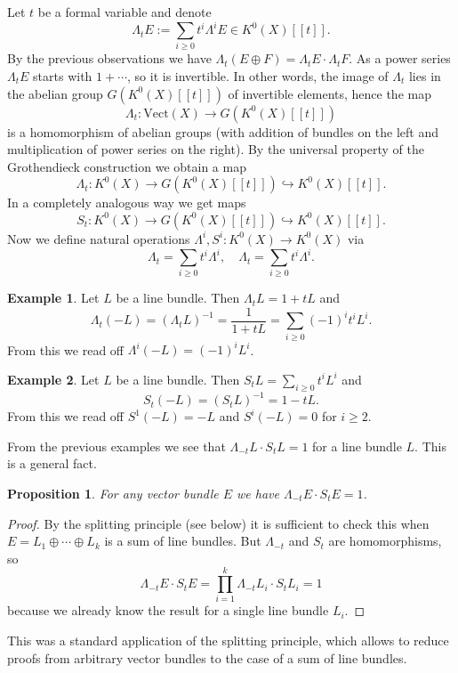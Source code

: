 \documentclass[a4paper,10pt]{article}
\theoremstyle{plain}%
\newtheorem{prop}[thm]{Proposition}
\theoremstyle{definition}
\newtheorem{exmp}{Example}
\theoremstyle{remark}
\newcommand{\Vect}{\mathrm{Vect}}  %
\begin{document}
Let $t$ be a formal variable and denote
$$\Lambda_t E:=\sum_{i\geq 0} t^i\Lambda^i E\in K^0(X)[[t]].$$
By the previous observations we have $\Lambda_t(E\oplus F)=\Lambda_tE\cdot\Lambda_tF$. As a power series $\Lambda_tE$ starts with $1+\cdots$, so it is invertible. In other words, the image of $\Lambda_t$ lies in the abelian group $G(K^0(X)[[t]])$ of invertible elements, hence the map
$$\Lambda_t:\Vect(X)\to G(K^0(X)[[t]])$$
is a homomorphism of abelian groups (with addition of bundles on the left and multiplication of power series on the right). By the universal property of the Grothendieck construction we obtain a map
$$\Lambda_t:K^0(X)\to G(K^0(X)[[t]])\hookrightarrow K^0(X)[[t]].$$
In a completely analogous way we get maps
$$S_t:K^0(X)\to G(K^0(X)[[t]])\hookrightarrow K^0(X)[[t]].$$
Now we define natural operations $\Lambda^i,S^i:K^0(X)\to K^0(X)$ via
$$\Lambda_t=\sum_{i\geq 0} t^i\Lambda^i,\quad \Lambda_t=\sum_{i\geq 0} t^i\Lambda^i.$$

\begin{exmp}
Let $L$ be a line bundle. Then $\Lambda_tL=1+tL$ and
$$\Lambda_t(-L)=(\Lambda_tL)^{-1}=\frac{1}{1+tL}=\sum_{i\geq 0}(-1)^it^iL^i.$$
From this we read off $\Lambda^i(-L)=(-1)^iL^i$.
\end{exmp}

\begin{exmp}
Let $L$ be a line bundle. Then $S_tL=\sum_{i\geq 0} t^iL^i$ and
$$S_t(-L)=(S_tL)^{-1}=1-tL.$$
From this we read off $S^1(-L)=-L$ and $S^i(-L)=0$ for $i\geq 2$.
\end{exmp}

From the previous examples we see that $\Lambda_{-t}L\cdot S_t L=1$ for a line bundle $L$. This is a general fact.

\begin{prop}
For any vector bundle $E$ we have $\Lambda_{-t}E\cdot S_t E=1$.
\end{prop}
\begin{proof}
By the splitting principle (see below) it is sufficient to check this when $E=L_1\oplus\cdots\oplus L_k$ is a sum of line bundles. But $\Lambda_{-t}$ and $S_t$ are homomorphisms, so
$$\Lambda_{-t}E\cdot S_t E=\prod_{i=1}^k\Lambda_{-t}L_i\cdot S_t L_i=1$$
because we already know the result for a single line bundle $L_i$.
\end{proof}

This was a standard application of the splitting principle, which allows to reduce proofs from arbitrary vector bundles to the case of a sum of line bundles.
\end{document}

